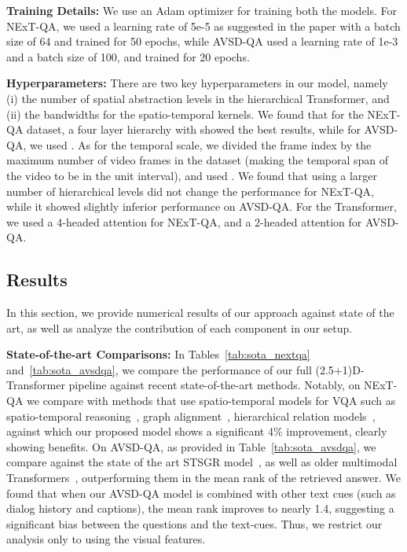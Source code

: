 \documentclass[letterpaper]{article} \usepackage{aaai22}  \usepackage{times}  \usepackage{helvet}  \usepackage{courier}  \usepackage[hyphens]{url}  \usepackage{graphicx} \urlstyle{rm} \def\UrlFont{\rm}  \usepackage{natbib}  \usepackage{caption} \DeclareCaptionStyle{ruled}{labelfont=normalfont,labelsep=colon,strut=off} \frenchspacing  \setlength{\pdfpagewidth}{8.5in}  \setlength{\pdfpageheight}{11in}  \usepackage{algorithm}
\newcommand{\nameTxr}{(2.5+1)D-Transformer\xspace}
\begin{document}
\noindent\textbf{Training Details:} We use an Adam optimizer for training both the models. For NExT-QA, we used a learning rate of 5e-5 as suggested in the paper with a batch size of 64 and trained for 50 epochs, while AVSD-QA used a learning rate of 1e-3 and a batch size of 100, and trained for 20 epochs.

\noindent\textbf{Hyperparameters:} There are two key hyperparameters in our model, namely (i) the number of spatial abstraction levels in the hierarchical Transformer, and (ii) the bandwidths for the spatio-temporal kernels. We found that for the NExT-QA dataset, a four layer hierarchy with  showed the best results, while for
AVSD-QA, we used . As for the temporal scale, we divided the frame index  by the maximum number of video frames in the dataset (making the temporal span of the video to be in the unit interval), and used . We found that using a larger number of hierarchical levels did not change the performance for NExT-QA, while it showed slightly inferior performance on AVSD-QA. For the Transformer, we used a 4-headed attention for NExT-QA, and a 2-headed attention for AVSD-QA. 

\subsection{Results}
In this section, we provide numerical results of our approach against state of the art, as well as analyze the contribution of each component in our setup. 

\noindent\textbf{State-of-the-art Comparisons:} In Tables~\ref{tab:sota_nextqa} and~\ref{tab:sota_avsdqa}, we compare the performance of our full \nameTxr pipeline against recent state-of-the-art methods. Notably, on NExT-QA we compare with methods that use spatio-temporal models for VQA such as spatio-temporal reasoning~\cite{jang2019video}, graph alignment~\cite{jiang2020reasoning}, hierarchical relation models~\cite{le2020hierarchical}, against which our proposed model shows a significant 4\% improvement, clearly showing benefits. On AVSD-QA, as provided in Table~\ref{tab:sota_avsdqa}, we compare against the state of the art STSGR model~\cite{geng2021dynamic}, as well as older multimodal Transformers~\cite{le2019multimodal}, outperforming them in the mean rank of the retrieved answer. We found that when our AVSD-QA model is combined with other text cues (such as dialog history and captions), the mean rank improves to nearly 1.4, suggesting a significant bias between the questions and the text-cues. Thus, we restrict our analysis only to using the visual features.
\end{document}
